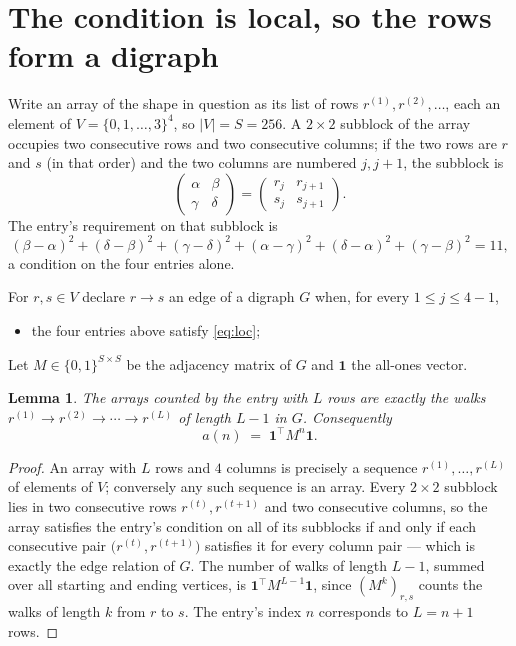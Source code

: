 \documentclass[11pt,a4paper]{article}
\theoremstyle{plain}
\newtheorem{lemma}[theorem]{Lemma}
\theoremstyle{definition}
\begin{document}
\section{The condition is local, so the rows form a digraph}

Write an array of the shape in question as its list of rows
$r^{(1)},r^{(2)},\dots$, each an element of
$V=\{0,1,\dots,3\}^{4}$, so $|V|=S=256$. A $2\times2$ subblock of the array
occupies two consecutive rows and two consecutive columns; if the two rows are $r$
and $s$ (in that order) and the two columns are numbered $j,j+1$,
the subblock is
\[
\begin{pmatrix}\alpha&\beta\\\gamma&\delta\end{pmatrix}=\begin{pmatrix}r_j&r_{j+1}\\s_j&s_{j+1}\end{pmatrix}.
\]
The entry's requirement on that subblock is
\begin{equation}\label{eq:loc}
(\beta-\alpha)^2+(\delta-\beta)^2+(\gamma-\delta)^2+(\alpha-\gamma)^2+(\delta-\alpha)^2+(\gamma-\beta)^2=11,
\end{equation}
a condition on the four entries alone.

For $r,s\in V$ declare $r\to s$ an edge of a digraph $G$ when, for every
$1\le j\le 4-1$,
\begin{itemize}
\item the four entries above satisfy \eqref{eq:loc};

\end{itemize}
Let $M\in\{0,1\}^{S\times S}$ be the adjacency matrix of $G$ and $\mathbf{1}$ the
all-ones vector.

\begin{lemma}\label{lem:walk}
The arrays counted by the entry with $L$ rows are exactly the walks
$r^{(1)}\to r^{(2)}\to\cdots\to r^{(L)}$ of length $L-1$ in $G$. Consequently
\[
a(n)\;=\;\mathbf{1}^{\!\top}M^{n}\mathbf{1} .
\]
\end{lemma}

\begin{proof}
An array with $L$ rows and $4$ columns is precisely a sequence
$r^{(1)},\dots,r^{(L)}$ of elements of $V$; conversely any such sequence is an array.
Every $2\times2$ subblock lies in two consecutive rows $r^{(t)},r^{(t+1)}$ and two
consecutive columns, so the array satisfies the entry's condition on all of its subblocks
if and only if each consecutive pair $\bigl(r^{(t)},r^{(t+1)}\bigr)$ satisfies it for
every column pair --- which is exactly the edge relation of $G$. The number of walks of
length $L-1$, summed over all starting and ending vertices, is
$\mathbf{1}^{\!\top}M^{L-1}\mathbf{1}$, since $(M^{k})_{r,s}$ counts the walks of
length $k$ from $r$ to $s$. The entry's index $n$ corresponds to $L=n+1$ rows.
\end{proof}
\end{document}

